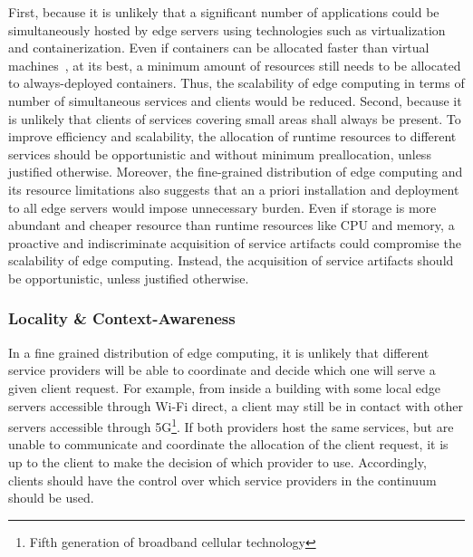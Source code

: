 



First, because it is unlikely that a significant number of applications could be simultaneously hosted by edge servers using technologies such as virtualization and containerization. Even if containers can be allocated faster than virtual machines~\cite{Quatrocchi2016discrete}, at its best, a minimum amount of resources still needs to be allocated to always-deployed containers. Thus, the scalability of edge computing in terms of number of simultaneous services and clients would be reduced. Second, because it is unlikely that clients of services covering small areas shall always be present. 
To improve efficiency and scalability, the allocation of runtime resources to different services should be opportunistic and without minimum preallocation, unless justified otherwise. %
Moreover, the fine-grained distribution of edge computing and its resource limitations also suggests that an a priori installation and deployment to all edge servers would impose unnecessary burden. Even if storage is more abundant and cheaper resource than runtime resources like CPU and memory, a proactive and indiscriminate acquisition of service artifacts could compromise the scalability of edge computing. Instead, the acquisition of service artifacts should be opportunistic, unless justified otherwise. %

\subsubsection{Locality \& Context-Awareness}\label{sec:context-awareness}


In a fine grained distribution of edge computing, it is unlikely that different service providers will be able to coordinate and decide which one will serve a given client request. For example, from inside a building with some local edge servers accessible through Wi-Fi direct, a client may still be in contact with other servers accessible through 5G\footnote{Fifth generation of broadband cellular technology}. If both providers host the same services, but are unable to communicate and coordinate the allocation of the client request, it is up to the client to make the decision of which provider to use. Accordingly, clients should have the control over which service providers in the continuum should be used. %

